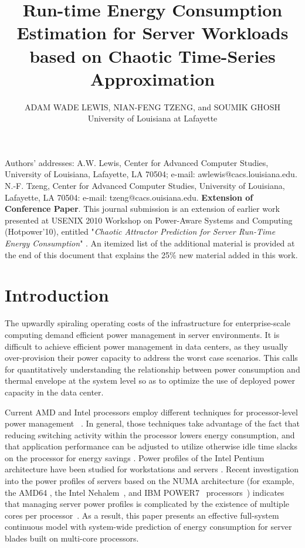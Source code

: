 \documentclass[acmtaco]{acmtrans2m}
\title{Run-time Energy Consumption
  Estimation for Server Workloads based on Chaotic Time-Series Approximation}
\author{ADAM WADE LEWIS, NIAN-FENG TZENG, and SOUMIK GHOSH\\ University
  of Louisiana at Lafayette }
\begin{document}
\setcounter{page}{1}
\begin{bottomstuff}
Authors' addresses: A.W. Lewis, Center for Advanced Computer Studies,
University of Louisiana, Lafayette, LA 70504; e-mail: awlewis@cacs.louisiana.edu.
N.-F. Tzeng, Center for Advanced Computer Studies, University of Louisiana, Lafayette,
LA 70504: e-mail: tzeng@cacs.ouisiana.edu.\newline 
\textbf{Extension of Conference Paper}. This journal submission is an
extension of earlier work presented at USENIX 2010 Workshop on Power-Aware Systems
and Computing (Hotpower'10), entitled "\textit{Chaotic Attractor Prediction
  for Server Run-Time Energy Consumption}" \cite{Lewis2010}. An
itemized list of the additional material is provided at the end of this
document that explains the 25\% new material added in this work.\newline
\end{bottomstuff}
\maketitle
\section{Introduction}
\label{sec:Introduction}
The upwardly spiraling operating costs of the infrastructure for
enterprise-scale computing demand efficient power management in server
environments.  It is difficult to achieve efficient power management in
data centers, as they usually over-provision their power capacity to
address the worst case scenarios. This calls for quantitatively
understanding the relationship between power consumption and thermal
envelope at the system level so as to optimize the use of deployed power
capacity in the data center.

Current AMD and Intel processors employ different techniques for
processor-level power management ~\cite{AMD2008b,Intel2009}. In general,
those techniques take advantage of the fact that reducing switching
activity within the processor lowers energy consumption, and that
application performance can be adjusted to utilize otherwise idle time
slacks on the processor for energy savings \cite{Contreras2005}.  Power
profiles of the Intel Pentium architecture have been studied for
workstations \cite{Isci2003a,Isci2003b,Isci2006} and servers
\cite{Bircher2004,Bircher2007,Lee2005}. Recent investigation into the
power profiles of servers based on the {NUMA} architecture (for example,
the AMD64 \cite{AMD2007}, the Intel Nehalem~\cite{Intel2009}, and IBM
POWER7~ processors~\cite{Ware2010,Brochard2010}) indicates that managing
server power profiles is complicated by the existence of multiple cores
per
processor~\cite{Kansal2010,Tsirogiannis2010,Lewis2010,McCullough2011}.
As a result, this paper presents an effective full-system continuous
model with system-wide prediction of energy consumption for server
blades built on multi-core processors.
\end{document}
